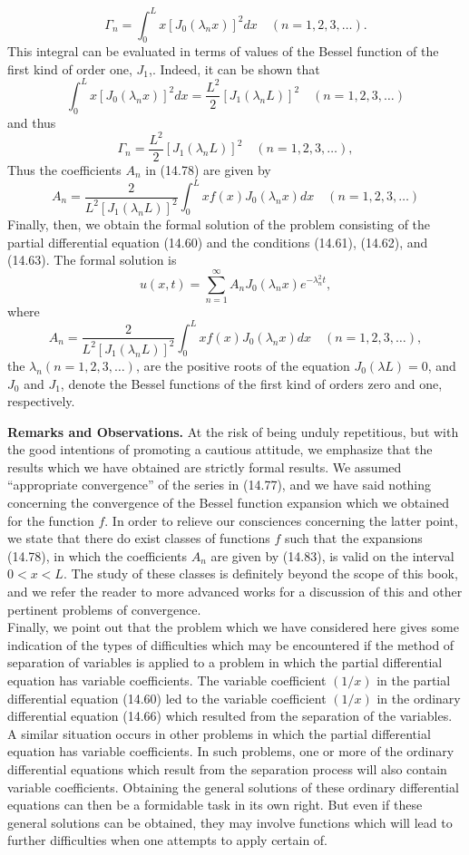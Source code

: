 \documentclass[11pt,a4paper, twoside]{report}
\begin{document}
	$$
	\varGamma_n = \int_0^L x[J_0 (\lambda_nx)]^2dx\quad (n=1,2,3,\ldots).
	$$
	This integral can be evaluated in terms of values of the Bessel function of the first kind of order one, $J_1$,. Indeed, it can be shown that
	$$
	\int_0^L x[J_0(\lambda_nx)]^2dx = \frac{L^2}{2}[J_1(\lambda_nL)]^2\quad (n = 1,2,3,\ldots)
	$$
	and thus
	$$
	\varGamma_n = \frac{L^2}{2}[J_1(\lambda_nL)]^2\quad (n=1,2,3,\ldots),
	$$
	Thus the coefficients $A_n$ in (14.78) are given by
	\begin{equation}\tag{14.83}
		A_n = \frac{2}{L^2[J_1(\lambda_nL)]^2}\int_0^L xf(x)J_0(\lambda_n x)dx\quad (n = 1,2,3,\ldots)
	\end{equation}
	Finally, then, we obtain the formal solution of the problem consisting of the partial  differential equation (14.60) and the conditions (14.61), (14.62), and (14.63). The formal solution is
	$$
	u(x,t) = \sum_{n=1}^\infty A_nJ_0(\lambda_n x)e^{-\lambda_n^2t},
	$$
	where
	$$
	A_n = \frac{2}{L^2[J_1(\lambda_nL)]^2}\int_0^L xf(x)J_0(\lambda_n x)dx\quad (n=1,2,3,\ldots),
	$$
	the $\lambda_n (n = 1,2,3,\ldots)$, are the positive roots of the equation $J_0(\lambda L) = 0$, and $J_0$ and $J_1$, denote the Bessel functions of the first kind of orders zero and one, respectively.\par
	\textbf{Remarks and Observations.} At the risk of being unduly repetitious, but with the good intentions of promoting a cautious attitude, we emphasize that the results which we have obtained are strictly formal results. We assumed “appropriate convergence” of the series in (14.77), and we have said nothing concerning the convergence of the Bessel function expansion which we obtained for the function $f$.  In order to relieve our consciences concerning the latter point, we state that there do exist classes of functions $f$ such that the expansions (14.78), in which the coefficients $A_n$ are given by (14.83), is valid on the interval $0 < x < L$. The study of these classes is definitely beyond the scope of this book, and we refer the reader to more advanced works for a discussion of this and other pertinent problems of convergence.\\
	Finally, we point out that the problem which we have considered here gives some  indication of the types of difficulties which may be encountered if the method of  separation of variables is applied to a problem in which the partial differential equation has variable coefficients.  The  variable coefficient  $(1/x)$ in the partial differential equation (14.60) led to the variable coefficient $(1/x)$ in the ordinary differential equation (14.66) which resulted from the separation of the variables. A similar situation occurs in other problems in which the partial differential equation has variable coefficients. In such problems, one or more of the ordinary differential equations which result from the separation process will also contain variable coefficients. Obtaining  the general solutions of these ordinary differential equations can then be a formidable task in its own right. But even if these general solutions can be obtained, they may involve functions which will lead to further difficulties when one attempts to apply certain of.
\end{document}
